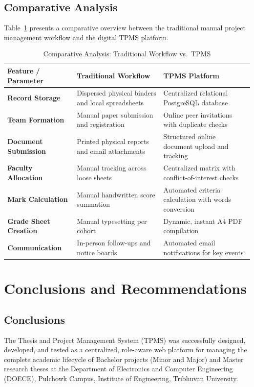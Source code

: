 \documentclass[12pt,a4paper]{report}
\begin{document}
\section{Comparative Analysis}
Table~\ref{tab:comparison} presents a comparative overview between the traditional manual project management workflow and the digital TPMS platform.

\begin{table}[H]
\centering
\caption{Comparative Analysis: Traditional Workflow vs.\ TPMS}
\label{tab:comparison}
\vspace{4pt}
\small
\begin{tabularx}{\textwidth}{@{}l p{4.8cm} X@{}}
\toprule
\textbf{Feature / Parameter} & \textbf{Traditional Workflow} & \textbf{TPMS Platform} \\
\midrule
\textbf{Record Storage} & Dispersed physical binders and local spreadsheets & Centralized relational PostgreSQL database \\
\addlinespace
\textbf{Team Formation} & Manual paper submission and registration & Online peer invitations with duplicate checks \\
\addlinespace
\textbf{Document Submission} & Printed physical reports and email attachments & Structured online document upload and tracking \\
\addlinespace
\textbf{Faculty Allocation} & Manual tracking across loose sheets & Centralized matrix with conflict-of-interest checks \\
\addlinespace
\textbf{Mark Calculation} & Manual handwritten score summation & Automated criteria calculation with words conversion \\
\addlinespace
\textbf{Grade Sheet Creation} & Manual typesetting per cohort & Dynamic, instant A4 PDF compilation \\
\addlinespace
\textbf{Communication} & In-person follow-ups and notice boards & Automated email notifications for key events \\
\bottomrule
\end{tabularx}
\end{table}

\chapter{Conclusions and Recommendations}

\section{Conclusions}
The Thesis and Project Management System (TPMS) was successfully designed, developed, and tested as a centralized, role-aware web platform for managing the complete academic lifecycle of Bachelor projects (Minor and Major) and Master research theses at the Department of Electronics and Computer Engineering (DOECE), Pulchowk Campus, Institute of Engineering, Tribhuvan University.
\end{document}
